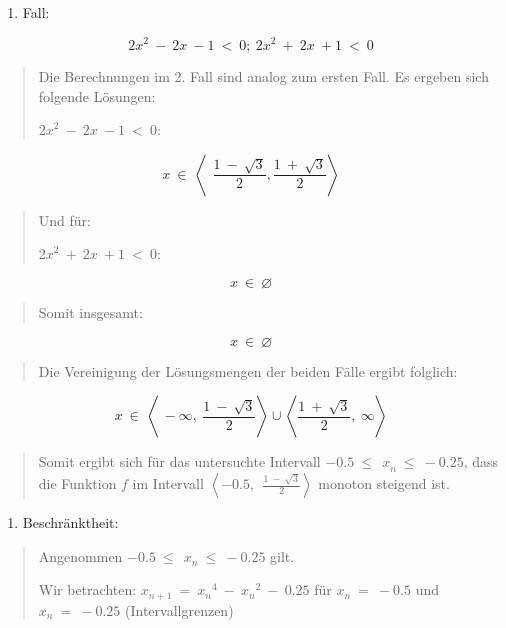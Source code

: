 \documentclass[a4paper, 12pt]{book}
\begin{document}
\begin{longtable}[]
\begin{minipage}[b]{\linewidth}
\begin{enumerate}
\def\labelenumi{\arabic{enumi}.}
\setcounter{enumi}{1}
\item
  Fall:
\end{enumerate}

\[{2x}^{2}\  - \ 2x\  - 1\  < \ 0;\ {2x}^{2}\  + \ 2x\  + 1\  < \ 0\]

\begin{quote}
Die Berechnungen im 2. Fall sind analog zum ersten Fall. Es ergeben sich
folgende Lösungen:

\({2x}^{2}\  - \ 2x\  - 1\  < \ 0\):
\end{quote}

\[x\  \in \ \left\langle \ \ \frac{1\  - \ \sqrt{3}}{2},\frac{1\  + \ \sqrt{3}}{2} \right\rangle\]

\begin{quote}
Und für:

\({2x}^{2}\  + \ 2x\  + 1\  < \ 0\):
\end{quote}

\[x\  \in \ \varnothing\]

\begin{quote}
Somit insgesamt:
\end{quote}

\[x\  \in \ \varnothing\]

\begin{quote}
Die Vereinigung der Lösungsmengen der beiden Fälle ergibt folglich:
\end{quote}

\[x\  \in \ \left\langle \  - \infty,\ \frac{1\  - \ \sqrt{3}}{2} \right\rangle \cup \left\langle \frac{1\  + \ \sqrt{3}}{2},\ \infty \right\rangle\]

\begin{quote}
Somit ergibt sich für das untersuchte Intervall
\(- 0.5\ {\leq \ \ x}_{n}\  \leq \  - 0.25\), dass die Funktion \(f\) im
Intervall
\(\left\langle - 0.5,\ \ \frac{1\  - \ \sqrt{3}}{2} \right\rangle\)
monoton steigend ist.
\end{quote}

\begin{enumerate}
\def\labelenumi{\arabic{enumi})}
\setcounter{enumi}{1}
\item
  Beschränktheit:
\end{enumerate}

\begin{quote}
Angenommen \(- 0.5\ {\leq \ \ x}_{n}\  \leq \  - 0.25\) gilt.

Wir betrachten:
\(x_{n + 1}\  = \ {x_{n}}^{4}\  - \ {x_{n}}^{2}\  - \ 0.25\) für
\(x_{n}\  = \  - 0.5\) und \(x_{n}\  = \  - 0.25\) (Intervallgrenzen)


\end{quote}
\end{minipage}
\end{longtable}
\end{document}
